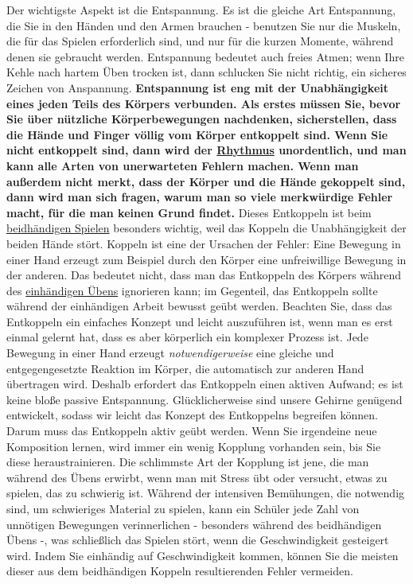 Der wichtigste Aspekt ist die Entspannung.
Es ist die gleiche Art Entspannung, die Sie in den Händen und den Armen brauchen - benutzen Sie nur die Muskeln, die für das Spielen erforderlich sind, und nur für die kurzen Momente, während denen sie gebraucht werden.
Entspannung bedeutet auch freies Atmen; wenn Ihre Kehle nach hartem Üben trocken ist, dann schlucken Sie nicht richtig, ein sicheres Zeichen von Anspannung.
\textbf{Entspannung ist eng mit der Unabhängigkeit eines jeden Teils des Körpers verbunden.
Als erstes müssen Sie, bevor Sie über nützliche Körperbewegungen nachdenken, sicherstellen, dass die Hände und Finger völlig vom Körper entkoppelt sind.
Wenn Sie nicht entkoppelt sind, dann wird der \hyperref[c1iii1b]{Rhythmus} unordentlich, und man kann alle Arten von unerwarteten Fehlern machen.
Wenn man außerdem nicht merkt, dass der Körper und die Hände gekoppelt sind, dann wird man sich fragen, warum man so viele merkwürdige Fehler macht, für die man keinen Grund findet.}
Dieses Entkoppeln ist beim \hyperref[c1ii25]{beidhändigen Spielen} besonders wichtig, weil das Koppeln die Unabhängigkeit der beiden Hände stört.
Koppeln ist eine der Ursachen der Fehler: Eine Bewegung in einer Hand erzeugt zum Beispiel durch den Körper eine unfreiwillige Bewegung in der anderen.
Das bedeutet nicht, dass man das Entkoppeln des Körpers während des \hyperref[c1ii7]{einhändigen Übens} ignorieren kann; im Gegenteil, das Entkoppeln sollte während der einhändigen Arbeit bewusst geübt werden.
Beachten Sie, dass das Entkoppeln ein einfaches Konzept und leicht auszuführen ist, wenn man es erst einmal gelernt hat, dass es aber körperlich ein komplexer Prozess ist.
Jede Bewegung in einer Hand erzeugt \textit{notwendigerweise} eine gleiche und entgegengesetzte Reaktion im Körper, die automatisch zur anderen Hand übertragen wird.
Deshalb erfordert das Entkoppeln einen aktiven Aufwand; es ist keine bloße passive Entspannung.
Glücklicherweise sind unsere Gehirne genügend entwickelt, sodass wir leicht das Konzept des Entkoppelns begreifen können.
Darum muss das Entkoppeln aktiv geübt werden.
Wenn Sie irgendeine neue Komposition lernen, wird immer ein wenig Kopplung vorhanden sein, bis Sie diese heraustrainieren.
Die schlimmste Art der Kopplung ist jene, die man während des Übens erwirbt, wenn man mit Stress übt oder versucht, etwas zu spielen, das zu schwierig ist.
Während der intensiven Bemühungen, die notwendig sind, um schwieriges Material zu spielen, kann ein Schüler jede Zahl von unnötigen Bewegungen verinnerlichen - besonders während des beidhändigen Übens -, was schließlich das Spielen stört, wenn die Geschwindigkeit gesteigert wird.
Indem Sie einhändig auf Geschwindigkeit kommen, können Sie die meisten dieser aus dem beidhändigen Koppeln resultierenden Fehler vermeiden.


